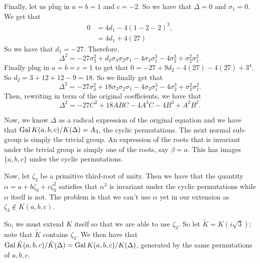Finally, let us plug in \(a = b = 1\) and \(c = -2\). So we have that \(\Delta = 0\) and \(\sigma_1 = 0\).
We get that
\begin{align}
0 & = 4d_1 - 4 (1 - 2 - 2)^3, \\
  & = 4d_1 + 4 (27) 
\end{align}
So we have that \(d_1 = -27\).
Therefore,
\begin{equation}
\Delta^2 = -27 \sigma_3^2 + d_2 \sigma_3 \sigma_2 \sigma_1 
- 4 \sigma_3 \sigma_1^3 - 4 \sigma_2^3 + \sigma_2^2 \sigma_1^2.
\end{equation}
Finally plug in \(a = b = c = 1\) to get that \(0 = -27 + 9d_2 - 4 (27) - 4 (27) + 3^4\). So
\(d_2 = 3 + 12 + 12 - 9 = 18\). So we finally get that
\begin{equation}
\Delta^2 = -27 \sigma_3^2 + 18 \sigma_3 \sigma_2 \sigma_1 
- 4 \sigma_3 \sigma_1^3 - 4 \sigma_2^3 + \sigma_2^2 \sigma_1^2.
\end{equation}
Then, rewriting in term of the original coefficients, we have that
\begin{equation}
\Delta^2 = -27 C^2 + 18 ABC
- 4 A^3C - 4 B^3 + A^2 B^2.
\end{equation}

Now, we know \(\Delta\) as a radical expression of the original equation and we have that
\(\operatorname{Gal} K(a, b, c) / K(\Delta) = A_3\), the cyclic permutations. The next normal sub-group
is simply the trivial group. An expression of the roots that is invariant under the trivial
group is simply one of the roots, say \(\beta = a\). This has images \(\{a, b, c\}\) under
the cyclic permutations. 

Now, let \(\zeta_3\) be a primitive third-root of unity. Then we have
that the quantity \(\alpha = a + b\zeta_3 + c\zeta_3^2\) satisfies that \(\alpha^3\) is
invariant under the cyclic permutations while \(\alpha\) itself is not. The problem is
that we can't use \(\alpha\) yet in our extension as \(\zeta_3 \not \in K(a, b, c)\).

So, we must extend \(K\) itself so that we are able to use \(\zeta_3\). So let
\(\tilde K = K(i\sqrt{3})\); note that \(\tilde K\) contains \(\zeta_3\). We then have that
\(\operatorname{Gal} \tilde K(a, b, c) / \tilde K(\Delta) = \operatorname{Gal} K(a, b, c) / K(\Delta)\), generated by
the same permutations of \(a, b, c\).

